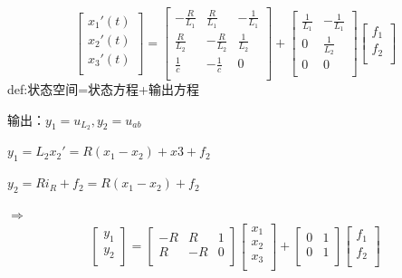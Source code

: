 \documentclass[UTF8]{ctexart}
\begin{document}
\begin{equation}
  \left[   
     \begin{matrix}
     x_1'(t) \\
     x_2'(t) \\
     x_3'(t) \\
     \end{matrix}
   \right]
   =  \left[   
     \begin{matrix}
     -\frac{R}{L_1}  &  \frac{R}{L_1} & -\frac{1}{L_1}  \\
     \frac{R}{L_2}  &  -\frac{R}{L_2} & \frac{1}{L_2}  \\
     \frac{1}{c}  &  -\frac{1}{c} & 0  \\
     \end{matrix}
   \right]
  +  \left[   
    \begin{matrix}
    \frac{1}{L_1}  & -\frac{1}{L_1}  \\
    0  & \frac{1}{L_2}  \\
    0  & 0  \\
    \end{matrix}
  \right]
  \left[   
    \begin{matrix}
    f_1 \\
    f_2 \\
    \end{matrix}
  \right]
  \nonumber
 \end{equation}
def:状态空间=状态方程+输出方程 \par
输出：$y_1=u_{L_2},y_2=u_{ab} $ \par
$ y_1=L_2x_2'=R(x_1-x_2)+x3+f_2 $ \par
$ y_2=Ri_R+f_2=R(x_1-x_2)+f_2 $ \par
$\Rightarrow $
\begin{equation}
  \left[   
     \begin{matrix}
     y_1 \\
     y_2 \\
     \end{matrix}
   \right]
   =  \left[   
     \begin{matrix}
     -R  &  R & 1  \\
     R  &  -R & 0  \\
     \end{matrix}
   \right]
   \left[   
    \begin{matrix}
    x_1 \\
    x_2 \\
    x_3 \\
    \end{matrix}
  \right]
  +\left[   
    \begin{matrix}
    0 & 1  \\
    0 & 1  \\
    \end{matrix}
  \right]
  \left[   
    \begin{matrix}
    f_1 \\
    f_2 \\
    \end{matrix}
  \right]
  \nonumber
 \end{equation}
\end{document}
